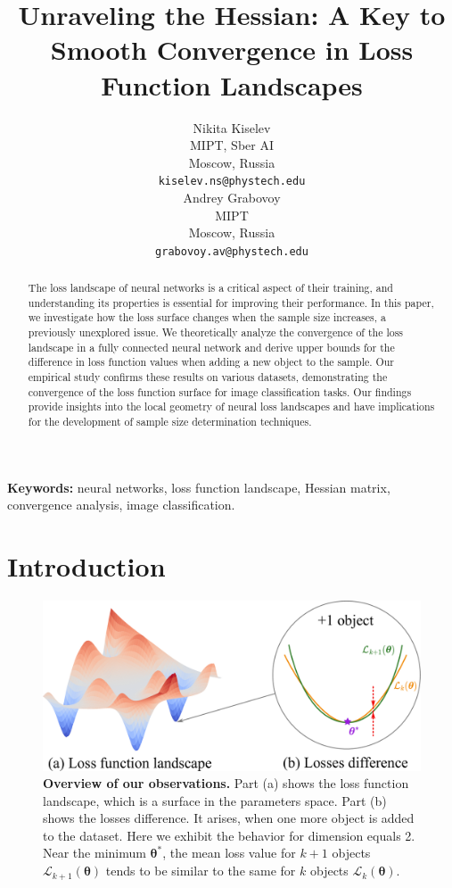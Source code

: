 \documentclass{article}
\title{Unraveling the Hessian: A Key to Smooth Convergence in Loss Function Landscapes}
\author{%
  Nikita Kiselev\\
  MIPT, Sber AI\\
  Moscow, Russia\\
  \texttt{kiselev.ns@phystech.edu}\\
  \And
  Andrey Grabovoy\\
  MIPT\\
  Moscow, Russia\\
  \texttt{grabovoy.av@phystech.edu}\\
}
\begin{document}
\maketitle

\begin{abstract}
    The loss landscape of neural networks is a critical aspect of their training, and understanding its properties is essential for improving their performance. In this paper, we investigate how the loss surface changes when the sample size increases, a previously unexplored issue. We theoretically analyze the convergence of the loss landscape in a fully connected neural network and derive upper bounds for the difference in loss function values when adding a new object to the sample. Our empirical study confirms these results on various datasets, demonstrating the convergence of the loss function surface for image classification tasks. Our findings provide insights into the local geometry of neural loss landscapes and have implications for the development of sample size determination techniques.
\end{abstract}

\textbf{Keywords:} neural networks, loss function landscape, Hessian matrix, convergence analysis, image classification.

\section{Introduction}\label{sec:intro}

\begin{figure}[ht]
    \centering
    \includegraphics[width=0.65\linewidth]{losses_difference.pdf}
    \caption{\textbf{Overview of our observations.} Part (a) shows the loss function landscape, which is a surface in the parameters space. Part (b) shows the losses difference. It arises, when one more object is added to the dataset. Here we exhibit the behavior for dimension equals 2. Near the minimum $\boldsymbol{\theta}^*$, the mean loss value for $k+1$ objects $\mathcal{L}_{k+1}(\boldsymbol{\theta})$ tends to be similar to the same for $k$ objects $\mathcal{L}_{k}(\boldsymbol{\theta})$.}
    \label{fig:overview}
\end{figure}
\end{document}
